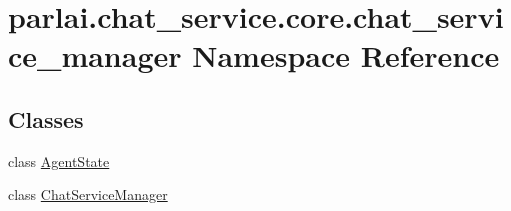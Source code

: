 \hypertarget{namespaceparlai_1_1chat__service_1_1core_1_1chat__service__manager}{}\section{parlai.\+chat\+\_\+service.\+core.\+chat\+\_\+service\+\_\+manager Namespace Reference}
\label{namespaceparlai_1_1chat__service_1_1core_1_1chat__service__manager}
\subsection*{Classes}
\begin{DoxyCompactItemize}
\item 
class \hyperlink{classparlai_1_1chat__service_1_1core_1_1chat__service__manager_1_1AgentState}{Agent\+State}
\item 
class \hyperlink{classparlai_1_1chat__service_1_1core_1_1chat__service__manager_1_1ChatServiceManager}{Chat\+Service\+Manager}
\end{DoxyCompactItemize}
